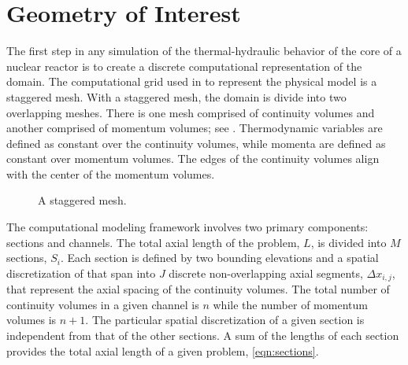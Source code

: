 \section{Geometry of Interest}
\label{sect:topology}
The first step in any simulation of the thermal-hydraulic behavior of the core of a nuclear reactor is to create a discrete computational representation of the domain.
The computational grid used in \cobra{} to represent the physical model is a staggered mesh.
With a staggered mesh, the domain is divide into two overlapping meshes.
There is one mesh comprised of continuity volumes and another comprised of momentum volumes; see .
Thermodynamic variables are defined as constant over the continuity volumes, while momenta are defined as constant over momentum volumes.
The edges of the continuity volumes align with the center of the momentum volumes.

\begin{figure}[ht]
\begin{center}
\end{center}
\caption{A staggered mesh.}
\label{fig:staggered_mesh}
\end{figure}

The computational modeling framework involves two primary components: sections and channels.
The total axial length of the problem, $L$, is divided into $M$ sections, $S_i$.
Each section is defined by two bounding elevations and a spatial discretization of that span into $J$ discrete non-overlapping axial segments, $\Delta x_{i,j}$, that represent the axial spacing of the continuity volumes.
The total number of continuity volumes in a given channel is $n$ while the number of momentum volumes is $n+1$.
The particular spatial discretization of a given section is independent from that of the other sections.
A sum of the lengths of each section provides the total axial length of a given problem, \eqref{eqn:sections}.

